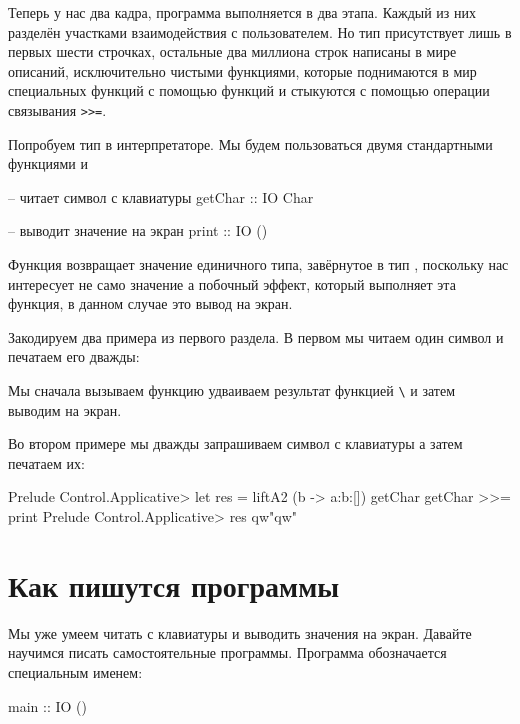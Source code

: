 Теперь у нас два кадра, программа выполняется в два этапа.
Каждый из них разделён участками взаимодействия с пользователем.
Но тип  присутствует  лишь в первых шести строчках,
остальные два миллиона строк написаны в мире описаний,
исключительно чистыми функциями, которые поднимаются
в мир специальных функций с помощью функций 
и стыкуются с помощью операции связывания \verb!>>=!.

Попробуем тип  в интерпретаторе. Мы будем
пользоваться двумя стандартными функциями  и 

\begin{code}
-- читает символ с клавиатуры
getChar :: IO Char

-- выводит значение на экран
print :: IO ()
\end{code}

Функция  возвращает значение единичного
типа, завёрнутое в тип , поскольку нас интересует
не само значение а побочный эффект, который выполняет 
эта функция, в данном случае это вывод на экран.

Закодируем два примера из первого раздела. В первом
мы читаем один символ и печатаем его дважды:


Мы сначала вызываем функцию  удваиваем результат
функцией \verb!\! и затем выводим на экран.

Во втором примере мы дважды запрашиваем символ с клавиатуры
а затем печатаем их:

\begin{code}
Prelude Control.Applicative> let res = liftA2 (\a b -> a:b:[]) getChar getChar >>= print
Prelude Control.Applicative> res
qw"qw"
\end{code}

\section{Как пишутся программы}

Мы уже умеем читать с клавиатуры и выводить значения
на экран. Давайте научимся писать самостоятельные
программы. Программа обозначается специальным именем: 

\begin{code}
main :: IO ()
\end{code}

